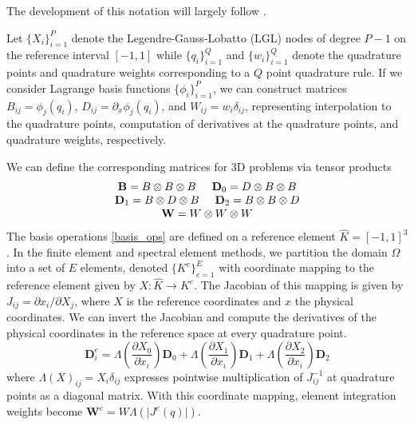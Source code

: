 The development of this notation will largely follow \cite{brown2010efficient}.

Let $\lbrace X_i \rbrace_{i = 1}^P$ denote the Legendre-Gauss-Lobatto (LGL) nodes of degree $P - 1$ on the reference interval $\left[ -1, 1 \right]$ while $\lbrace q_i \rbrace_{i = 1}^Q$ and $\lbrace w_i \rbrace_{i = 1}^Q$ denote the quadrature points and quadrature weights corresponding to a $Q$ point quadrature rule.
If we consider Lagrange basis functions $\lbrace \phi_i \rbrace_{i = 1}^P$, we can construct matrices $B_{i j} = \phi_j \left( q_i \right)$, $D_{i j} = \partial_x \phi_j \left( q_i \right)$, and $W_{i j} = w_i \delta_{i j}$, representing interpolation to the quadrature points, computation of derivatives at the quadrature points, and quadrature weights, respectively.

We can define the corresponding matrices for 3D problems via tensor products
\begin{equation}
\begin{array}{c}
\mathbf{B}   = B \otimes B \otimes B \hspace{5mm}
\mathbf{D}_0 = D \otimes B \otimes B\\
\mathbf{D}_1 = B \otimes D \otimes B \hspace{5mm}
\mathbf{D}_2 = B \otimes B \otimes D\\
\mathbf{W}   = W \otimes W \otimes W
\end{array}
\label{basis_ops}
\end{equation}
The basis operations \ref{basis_ops} are defined on a reference element $\hat{K} = \left[ -1, 1 \right]^3$.
In the finite element and spectral element methods, we partition the domain $\Omega$ into a set of $E$ elements, denoted $\lbrace K^e \rbrace_{e = 1}^E$ with coordinate mapping to the reference element given by $X : \hat{K} \rightarrow K^e$.
The Jacobian of this mapping is given by $J_{i j} = \partial x_i / \partial X_j$, where $X$ is the reference coordinates and $x$ the physical coordinates.
We can invert the Jacobian and compute the derivatives of the physical coordinates in the reference space at every quadrature point.
\begin{equation}
\mathbf{D}_i^e = \Lambda \left( \frac{\partial X_0}{\partial x_i} \right) \mathbf{D}_0 + \Lambda \left( \frac{\partial X_1}{\partial x_i} \right) \mathbf{D}_1 + \Lambda \left( \frac{\partial X_2}{\partial x_i} \right) \mathbf{D}_2
\end{equation}
where $\Lambda \left( X \right)_{i j} = X_i \delta_{i j}$ expresses pointwise multiplication of $J_{i j}^{-1}$ at quadrature points as a diagonal matrix.
With this coordinate mapping, element integration weights become $\mathbf{W}^e = W \Lambda \left( \lvert J^e \left( q \right) \rvert \right)$.

